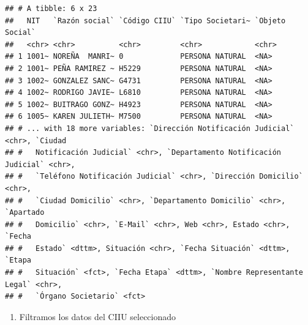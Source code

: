 \documentclass[
  11pt,
]{book}
\providecommand{\tightlist}{%
  \setlength{\itemsep}{0pt}\setlength{\parskip}{0pt}}
\begin{document}
\begin{verbatim}
## # A tibble: 6 x 23
##   NIT   `Razón social` `Código CIIU` `Tipo Societari~ `Objeto Social`
##   <chr> <chr>          <chr>         <chr>            <chr>          
## 1 1001~ NOREÑA  MANRI~ 0             PERSONA NATURAL  <NA>           
## 2 1001~ PEÑA RAMIREZ ~ H5229         PERSONA NATURAL  <NA>           
## 3 1002~ GONZALEZ SANC~ G4731         PERSONA NATURAL  <NA>           
## 4 1002~ RODRIGO JAVIE~ L6810         PERSONA NATURAL  <NA>           
## 5 1002~ BUITRAGO GONZ~ H4923         PERSONA NATURAL  <NA>           
## 6 1005~ KAREN JULIETH~ M7500         PERSONA NATURAL  <NA>           
## # ... with 18 more variables: `Dirección Notificación Judicial` <chr>, `Ciudad
## #   Notificación Judicial` <chr>, `Departamento Notificación Judicial` <chr>,
## #   `Teléfono Notificación Judicial` <chr>, `Dirección Domicilio` <chr>,
## #   `Ciudad Domicilio` <chr>, `Departamento Domicilio` <chr>, `Apartado
## #   Domicilio` <chr>, `E-Mail` <chr>, Web <chr>, Estado <chr>, `Fecha
## #   Estado` <dttm>, Situación <chr>, `Fecha Situación` <dttm>, `Etapa
## #   Situación` <fct>, `Fecha Etapa` <dttm>, `Nombre Representante Legal` <chr>,
## #   `Órgano Societario` <fct>
\end{verbatim}

\begin{enumerate}
\def\labelenumi{\arabic{enumi}.}
\setcounter{enumi}{1}
\tightlist
\item
  Filtramos los datos del CIIU seleccionado
\end{enumerate}
\end{document}
